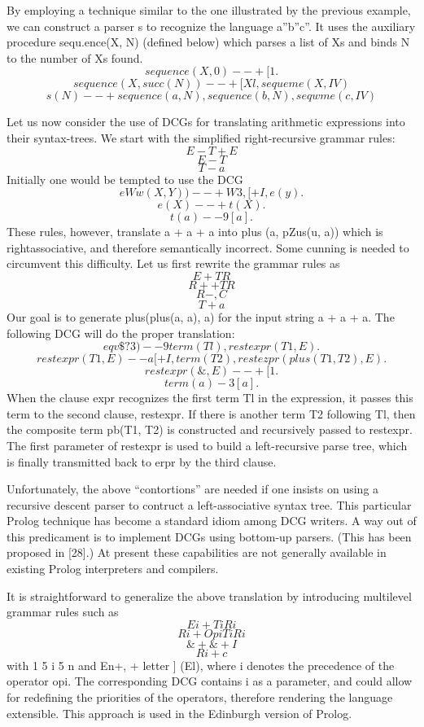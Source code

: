 By employing a technique similar to the one illustrated by the previous
example, we can construct a parser s to recognize the language a”b”c”. It uses
the auxiliary procedure sequ.ence(X, N) (defined below) which parses a list of Xs
and binds N to the number of Xs found.
\[sequence(X, 0) --+ [ 1.\]
\[sequence(X, succ(N)) --+ [Xl, sequeme(X, IV)\]
\[s(N) --+ sequence(a, N), sequence(b, N), seqwme(c, IV)\]

Let us now consider the use of DCGs for translating arithmetic expressions
into their syntax-trees. We start with the simplified right-recursive grammar
rules:
\[E-T +E\]
\[E-T\]
\[T-a\]
Initially one would be tempted to use the DCG
\[eWw(X, Y)) --+ W3, [+I, e(y).\]
\[e(X) --+ t(X).\]
\[t(a) --9 [a].\]
These rules, however, translate a + a + a into plus (a, pZus(u, a)) which is rightassociative,
and therefore semantically incorrect. Some cunning is needed to 
circumvent this difficulty. Let us first rewrite the grammar rules as
\[E+TR\]
\[R++TR\]
\[R-,C\]
\[T+a\]
Our goal is to generate plus(plus(a, a), a) for the input string a + a + a. The
following DCG will do the proper translation:
\[eqv\$?3) --9 term(Tl), restexpr(T1, E).\]
\[restexpr(T1, E) --a [+I, term(T2), restezpr(plus(T1, T2), E).\]
\[restexpr(\&, E) --+ [ 1.\]
\[term(a) -3 [a].\]
When the clause expr recognizes the first term Tl in the expression, it passes
this term to the second clause, restexpr. If there is another term T2 following
Tl, then the composite term pb(T1, T2) is constructed and recursively passed
to restexpr. The first parameter of restexpr is used to build a left-recursive parse
tree, which is finally transmitted back to erpr by the third clause. 

Unfortunately, the above “contortions” are needed if one insists on using a
recursive descent parser to contruct a left-associative syntax tree. This particular
Prolog technique has become a standard idiom among DCG writers. A way out
of this predicament is to implement DCGs using bottom-up parsers. (This has
been proposed in [28].) At present these capabilities are not generally available
in existing Prolog interpreters and compilers. 

It is straightforward to generalize the above translation by introducing multilevel
grammar rules such as
\[Ei + TiRi\]
\[Ri + OpiTiRi\]
\[\& + \&+I\]
\[Ri + c\]
with 1 5 i 5 n and En+, + letter ] (El), where i denotes the precedence of the
operator opi. The corresponding DCG contains i as a parameter, and could allow
for redefining the priorities of the operators, therefore rendering the language
extensible. This approach is used in the Edinburgh version of Prolog.      

